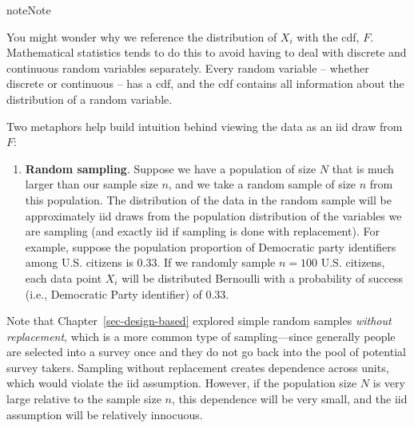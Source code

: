 \documentclass[
  13pt,
  letterpaper,
  DIV=11,
  numbers=noendperiod]{scrreprt}
\providecommand{\tightlist}{%
  \setlength{\itemsep}{0pt}\setlength{\parskip}{0pt}}
\theoremstyle{plain}
\theoremstyle{plain}
\theoremstyle{definition}
\theoremstyle{definition}
\theoremstyle{remark}
\begin{document}
\begin{bookcallout}{note}{Note}

You might wonder why we reference the distribution of \(X_i\) with the
cdf, \(F\). Mathematical statistics tends to do this to avoid having to
deal with discrete and continuous random variables separately. Every
random variable -- whether discrete or continuous -- has a cdf, and the
cdf contains all information about the distribution of a random
variable.

\end{bookcallout}

Two metaphors help build intuition behind viewing the data as an iid
draw from \(F\):

\begin{enumerate}
\def\labelenumi{\arabic{enumi}.}
\tightlist
\item
  \textbf{Random sampling}. Suppose we have a population of size \(N\)
  that is much larger than our sample size \(n\), and we take a random
  sample of size \(n\) from this population. The distribution of the
  data in the random sample will be approximately iid draws from the
  population distribution of the variables we are sampling (and exactly
  iid if sampling is done with replacement). For example, suppose the
  population proportion of Democratic party identifiers among U.S.
  citizens is 0.33. If we randomly sample \(n = 100\) U.S. citizens,
  each data point \(X_i\) will be distributed Bernoulli with a
  probability of success (i.e., Democratic Party identifier) of 0.33.
\end{enumerate}

Note that Chapter~\ref{sec-design-based} explored simple random samples
\emph{without replacement}, which is a more common type of
sampling---since generally people are selected into a survey once and
they do not go back into the pool of potential survey takers. Sampling
without replacement creates dependence across units, which would violate
the iid assumption. However, if the population size \(N\) is very large
relative to the sample size \(n\), this dependence will be very small,
and the iid assumption will be relatively innocuous.
\end{document}
